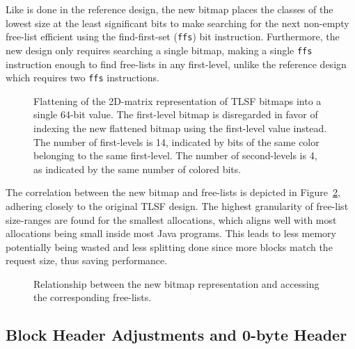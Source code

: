 Like is done in the reference design, the new bitmap places the classes of the lowest size at the least significant bits to make searching for the next non-empty free-list efficient using the find-first-set (\texttt{ffs}) bit instruction. Furthermore, the new design only requires searching a single bitmap, making a single \texttt{ffs} instruction enough to find free-lists in any first-level, unlike the reference design which requires two \texttt{ffs} instructions.

\begin{figure}[H]
    \centering
    
    \vspace*{4mm}
    \caption{Flattening of the 2D-matrix representation of TLSF bitmaps into a single 64-bit value. The first-level bitmap is disregarded in favor of indexing the new flattened bitmap using the first-level value instead. The number of first-levels is 14, indicated by bits of the same color belonging to the same first-level. The number of second-levels is 4, as indicated by the same number of colored bits.}
    \label{fig:bitmap_flattening}
\end{figure}

The correlation between the new bitmap and free-lists is depicted in Figure~\ref{fig:bitmap_relationship}, adhering closely to the original TLSF design. The highest granularity of free-list size-ranges are found for the smallest allocations, which aligns well with most allocations being small inside most Java programs. This leads to less memory potentially being wasted and less splitting done since more blocks match the request size, thus saving performance.

\begin{figure}[H]
    \centering
    \vspace*{0.2cm}
    
    \vspace*{1mm}
    \caption{Relationship between the new bitmap representation and accessing the corresponding free-lists.}
    \label{fig:bitmap_relationship}
\end{figure}

\subsection{Block Header Adjustments and 0-byte Header}
\label{sec:adaptations_impl:0-byte-header}

